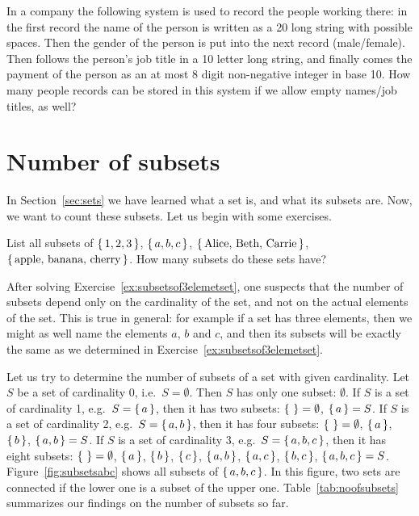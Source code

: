 \begin{exercise}\label{ex:company}
In a company the following system is used to record the people working there: 
in the first record the name of the person is written as a 20 long string with possible spaces. 
Then the gender of the person is put into the next record (male/female). 
Then follows the person's job title in a 10 letter long string, 
and finally comes the payment of the person as an at most 8 digit non-negative integer in base 10. 
How many people records can be stored in this system if we allow empty names/job titles, as well? 
\end{exercise}





\section{Number of subsets}\label{sec:subsets}

In Section~\ref{sec:sets} we have learned what a set is, 
and what its subsets are. 
Now, we want to count these subsets. 
Let us begin with some exercises. 

\begin{exercise}\label{ex:subsetsof3elemetset}
List all subsets of %
$\left\{\,1, 2, 3\,\right\}$, $\left\{\,a, b, c\,\right\}$, $\left\{\,\text{Alice, Beth, Carrie}\,\right\}$, $\left\{\,\text{apple, banana, cherry}\,\right\}$. 
How many subsets do these sets have? 
\end{exercise}

After solving Exercise~\ref{ex:subsetsof3elemetset}, 
one suspects that the number of subsets depend only on the cardinality of the set, 
and not on the actual elements of the set. 
This is true in general: 
for example if a set has three elements, 
then we might as well name the elements $a$, $b$ and $c$, 
and then its subsets will be exactly the same as we determined in Exercise~\ref{ex:subsetsof3elemetset}. 

Let us try to determine the number of subsets of a set with given cardinality. 
Let $S$ be a set of cardinality 0, i.e.\ $S = \emptyset$. 
Then $S$ has only one subset: $\emptyset$. 
If $S$ is a set of cardinality 1, e.g.\ $S = \left\{\,a\,\right\}$, 
then it has two subsets: $\left\{\,\,\right\} = \emptyset$, $\left\{\,a\,\right\} = S$. 
If $S$ is a set of cardinality 2, e.g.\ $S = \left\{\,a, b\,\right\}$, 
then it has four subsets: $\left\{\,\,\right\} = \emptyset$, $\left\{\,a\,\right\}$, $\left\{\,b\,\right\}$, $\left\{\,a, b\,\right\} = S$. 
If $S$ is a set of cardinality 3, e.g.\ $S = \left\{\,a, b, c\,\right\}$, 
then it has eight subsets: $\left\{\,\,\right\} = \emptyset$, $\left\{\,a\,\right\}$, $\left\{\,b\,\right\}$, $\left\{\,c\,\right\}$, 
$\left\{\,a, b\,\right\}$, $\left\{\,a, c\,\right\}$, $\left\{\,b, c\,\right\}$, 
$\left\{\,a, b, c\,\right\} = S$. 
Figure~\ref{fig:subsetsabc} shows all subsets of $\left\{\,a, b, c\,\right\}$. 
In this figure, two sets are connected if the lower one is a subset of the upper one. 
Table~\ref{tab:noofsubsets} summarizes our findings on the number of subsets so far. 

